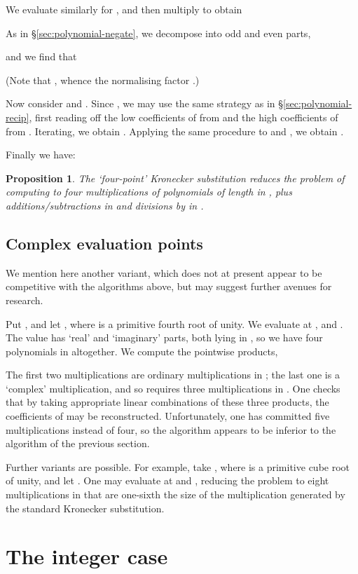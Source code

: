 \documentclass{amsart}
\newtheorem{prop}[thm]{Proposition}
\theoremstyle{definition}
\theoremstyle{remark}
\begin{document}
We evaluate similarly for , and then multiply to obtain


As in \S\ref{sec:polynomial-negate}, we decompose  into odd and even parts,
  
and we find that

(Note that , whence the normalising factor .)

Now consider  and . Since , we may use the same strategy as in \S\ref{sec:polynomial-recip}, first reading off the low  coefficients of  from  and the high  coefficients of  from . Iterating, we obtain . Applying the same procedure to  and , we obtain .

Finally we have:
\begin{prop}
\label{prop:polynomial-four-ks}
The `four-point' Kronecker substitution reduces the problem of computing  to four multiplications of polynomials of length  in , plus  additions/subtractions in  and  divisions by  in .
\end{prop}


\subsection{Complex evaluation points} We mention here another variant, which does not at present appear to be competitive with the algorithms above, but may suggest further avenues for research.

Put , and let , where  is a primitive fourth root of unity. We evaluate at ,  and . The value  has `real' and `imaginary' parts, both lying in , so we have four polynomials in  altogether. We compute the pointwise products,

The first two multiplications are ordinary multiplications in ; the last one is a `complex' multiplication, and so requires three multiplications in . One checks that by taking appropriate linear combinations of these three products, the coefficients of  may be reconstructed. Unfortunately, one has committed five multiplications instead of four, so the algorithm appears to be inferior to the algorithm of the previous section.

Further variants are possible. For example, take , where  is a primitive cube root of unity, and let . One may evaluate at  and , reducing the problem to eight multiplications in  that are one-sixth the size of the multiplication generated by the standard Kronecker substitution.



\section{The integer case}
\label{sec:integer}
\end{document}
